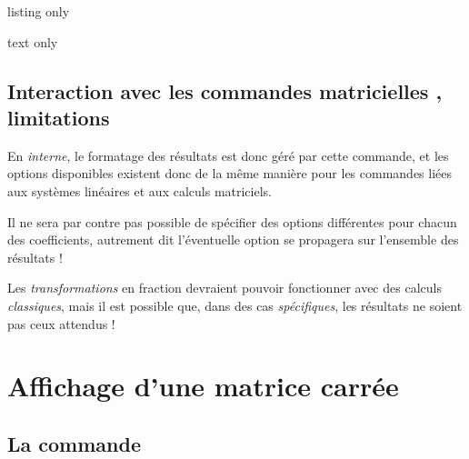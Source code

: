 \documentclass[french,a4paper,11pt]{article}
\begin{document}
\begin{PresentationCode}{listing only}
\end{PresentationCode}

\begin{PresentationCode}{text only}
\hfill{} \qquad
{} \qquad
{} \qquad
{} \qquad
{} \qquad
{}\hfill~
\end{PresentationCode}

\subsection{Interaction avec les commandes \og matricielles \fg, limitations}

\begin{warningblock}
En \textit{interne}, le formatage des résultats est donc géré par cette commande, et les options disponibles existent donc de la même manière pour les commandes liées aux systèmes linéaires et aux calculs matriciels.

\smallskip

Il ne sera par contre pas possible de spécifier des options différentes pour chacun des coefficients, autrement dit l'éventuelle option se propagera sur l'ensemble des résultats !

\smallskip

Les \textit{transformations} en fraction devraient pouvoir fonctionner avec des calculs \textit{classiques}, mais il est possible que, dans des cas \textit{spécifiques}, les résultats ne soient pas ceux attendus !
\end{warningblock}

\pagebreak

\section{Affichage d'une matrice carrée}

\subsection{La commande}
\end{document}
